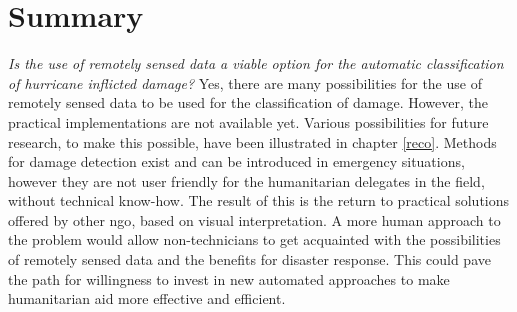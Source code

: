 \section{Summary}
\noindent \textit{Is the use of remotely sensed data a viable option for the automatic classification of hurricane inflicted damage?} Yes, there are many possibilities for the use of remotely sensed data to be used for the classification of damage. However, the practical implementations are not available yet. Various possibilities for future research, to make this possible, have been illustrated in chapter \ref{reco}. Methods for damage detection exist and can be introduced in emergency situations, however they are not user friendly for the humanitarian delegates in the field, without technical know-how. The result of this is the return to practical solutions offered by other \ac{ngo}, based on visual interpretation. A more human approach to the problem would allow non-technicians to get acquainted with the possibilities of remotely sensed data and the benefits for disaster response. This could pave the path for willingness to invest in new automated approaches to make humanitarian aid more effective and efficient.

